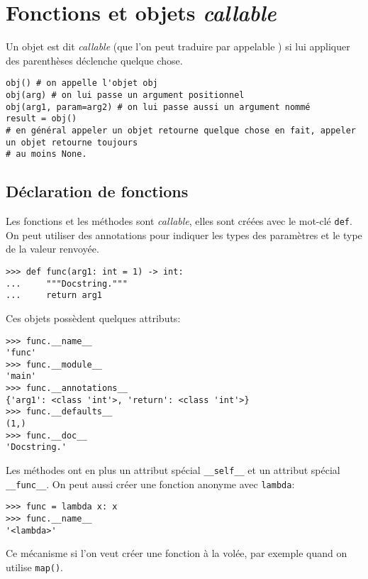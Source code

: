 \section{Fonctions et objets {\normalfont\bfseries\itshape callable}}
Un objet est dit \textit{callable} (que l'on peut traduire par \og appelable \fg{}) si lui appliquer des parenthèses déclenche quelque chose.

\begin{verbatim}
obj() # on appelle l'objet obj
obj(arg) # on lui passe un argument positionnel
obj(arg1, param=arg2) # on lui passe aussi un argument nommé
result = obj() 
# en général appeler un objet retourne quelque chose en fait, appeler un objet retourne toujours
# au moins None.
\end{verbatim}

\subsection{Déclaration de fonctions}

Les fonctions et les méthodes sont \textit{callable}, elles sont créées avec le mot-clé \texttt{def}. On
peut utiliser des annotations pour indiquer les types des paramètres et le type de la valeur renvoyée.

\begin{verbatim}
>>> def func(arg1: int = 1) -> int:
...     """Docstring."""
...     return arg1
\end{verbatim}

Ces objets possèdent quelques attributs:

\begin{verbatim}
>>> func.__name__
'func'
>>> func.__module__
'main'
>>> func.__annotations__
{'arg1': <class 'int'>, 'return': <class 'int'>}
>>> func.__defaults__
(1,)
>>> func.__doc__
'Docstring.'
\end{verbatim}

Les méthodes ont en plus un attribut spécial \texttt{__self__} et un attribut spécial \texttt{__func__}. On peut aussi créer une fonction anonyme avec \texttt{lambda}:

\begin{verbatim}
>>> func = lambda x: x
>>> func.__name__
'<lambda>'
\end{verbatim}

Ce mécanisme si l'on veut créer une fonction à la volée, par exemple quand on utilise \texttt{map()}.

